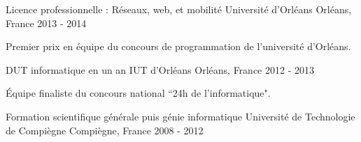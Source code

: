 \begin{cventries}
  \cventry
    {Licence professionnelle : Réseaux, web, et mobilité}
    {Université d'Orléans}
    {Orléans, France}
    {2013 - 2014}
    {
      \begin{cvitems}
        \item {Premier prix en équipe du concours de programmation de l'université d'Orléans.}
      \end{cvitems}
    }
  \cventry
    {DUT informatique en un an}
    {IUT d'Orléans}
    {Orléans, France}
    {2012 - 2013}
    {
      \begin{cvitems}
        \item {Équipe finaliste du concours national ``24h de l'informatique".}
      \end{cvitems}
    }
  \cventry
    {Formation scientifique générale puis génie informatique}
    {Université de Technologie de Compiègne}
    {Compiègne, France}
    {2008 - 2012}
    {}
\end{cventries}

